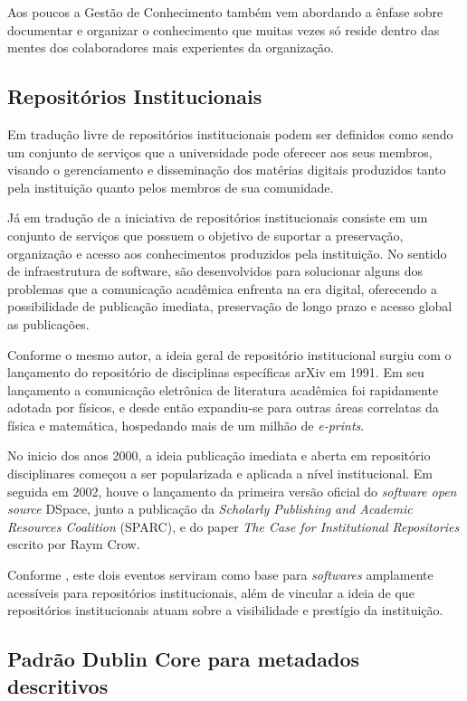 Aos poucos a Gestão de Conhecimento também vem abordando a ênfase sobre documentar
e organizar o conhecimento que muitas vezes só reside dentro das mentes
dos colaboradores mais experientes da organização.

\subsection{Repositórios Institucionais}

Em tradução livre de \cite{LYNCH:2003} repositórios institucionais podem
ser definidos como sendo um conjunto de serviços que a universidade pode
oferecer aos seus membros, visando o gerenciamento e disseminação dos matérias
digitais produzidos tanto pela instituição quanto pelos membros de sua comunidade.

Já em tradução de \cite{2015:Callicott} a iniciativa de repositórios institucionais
consiste em um conjunto de serviços que possuem o objetivo de suportar a preservação,
organização e acesso aos conhecimentos produzidos pela instituição. No sentido de
infraestrutura de software, são desenvolvidos para solucionar alguns dos problemas
que a comunicação acadêmica enfrenta na era digital, oferecendo a possibilidade
de publicação imediata, preservação de longo prazo e acesso global as publicações.

Conforme o mesmo autor, a ideia geral de repositório institucional surgiu com o
lançamento do repositório de disciplinas específicas arXiv em 1991. Em seu
lançamento a comunicação eletrônica de literatura acadêmica foi rapidamente
adotada por físicos, e desde então expandiu-se para outras áreas correlatas
da física e matemática, hospedando mais de um milhão de \emph{e-prints}.

No inicio dos anos 2000, a ideia publicação imediata e aberta em
repositório disciplinares começou a ser popularizada e aplicada a nível
institucional. Em seguida em 2002, houve o lançamento da primeira versão
oficial do \emph{software open source} DSpace, junto a publicação da
\emph{Scholarly Publishing and Academic Resources Coalition} (SPARC),
e do paper \emph{The Case for Institutional Repositories} escrito por
Raym Crow.

Conforme \cite{2015:Callicott}, este dois eventos serviram como base
para \emph{softwares} amplamente acessíveis para repositórios institucionais,
além de vincular a ideia de que repositórios institucionais atuam
sobre a visibilidade e prestígio da instituição.

\subsection{Padrão Dublin Core para metadados descritivos}

